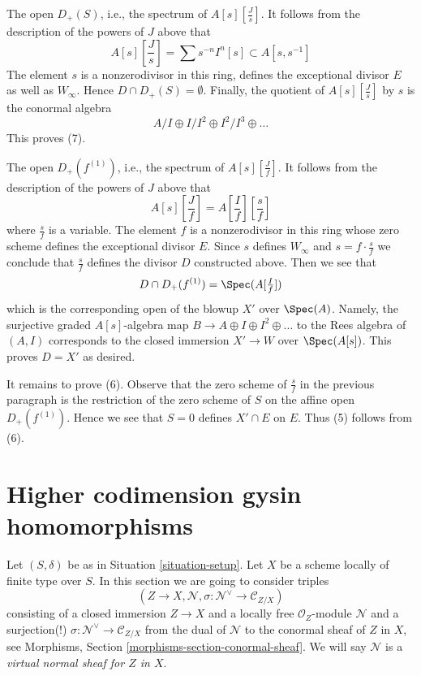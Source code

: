\medskip\noindent
The open $D_+(S)$, i.e., the spectrum of $A[s][\frac{J}{s}]$.
It follows from the description of the powers of $J$ above
that
$$
A[s][\textstyle{\frac{J}{s}}] = \sum s^{-n}I^n[s] \subset A[s, s^{-1}]
$$
The element $s$ is a nonzerodivisor in this ring, defines the exceptional
divisor $E$ as well as $W_\infty$. Hence $D \cap D_+(S) = \emptyset$.
Finally, the quotient of $A[s][\frac{J}{s}]$ by $s$ is the conormal algebra
$$
A/I \oplus I/I^2 \oplus I^2/I^3 \oplus \ldots
$$
This proves (7).

\medskip\noindent
The open $D_+(f^{(1)})$, i.e., the spectrum of $A[s][\frac{J}{f}]$.
It follows from the description of the powers of $J$ above that
$$
A[s][\textstyle{\frac{J}{f}}] =
A[\textstyle{\frac{I}{f}}][\textstyle{\frac{s}{f}}]
$$
where $\frac{s}{f}$ is a variable. The element $f$ is a nonzerodivisor
in this ring whose zero scheme defines the exceptional divisor $E$.
Since $s$ defines $W_\infty$ and $s = f \cdot \frac{s}{f}$
we conclude that $\frac{s}{f}$ defines
the divisor $D$ constructed above. Then we see that
$$
D \cap D_+(f^{(1)}) = \Spec(A[\textstyle{\frac{I}{f}}])
$$
which is the corresponding open of the blowup $X'$ over $\Spec(A)$.
Namely, the surjective graded $A[s]$-algebra map
$B \to A \oplus I \oplus I^2 \oplus \ldots$
to the Rees algebra of $(A, I)$ corresponds to the closed
immersion $X' \to W$ over $\Spec(A[s])$.
This proves $D = X'$ as desired.

\medskip\noindent
It remains to prove (6). Observe that the zero scheme of $\frac{s}{f}$
in the previous paragraph is the restriction of the zero scheme of $S$
on the affine open $D_+(f^{(1)})$. Hence we see that $S = 0$ defines
$X' \cap E$ on $E$. Thus (5) follows from (6).









\section{Higher codimension gysin homomorphisms}
\label{section-gysin-higher-codimension}

\noindent
Let $(S, \delta)$ be as in Situation \ref{situation-setup}. Let $X$ be a scheme
locally of finite type over $S$. In this section we are going to consider
triples
$$
(Z \to X, \mathcal{N}, \sigma : \mathcal{N}^\vee \to \mathcal{C}_{Z/X})
$$
consisting of a closed immersion $Z \to X$ and a locally free
$\mathcal{O}_Z$-module $\mathcal{N}$ and a surjection(!)
$\sigma : \mathcal{N}^\vee \to \mathcal{C}_{Z/X}$ from the dual
of $\mathcal{N}$ to the conormal sheaf of $Z$ in $X$, see
Morphisms, Section \ref{morphisms-section-conormal-sheaf}.
We will say
$\mathcal{N}$ is a {\it virtual normal sheaf for $Z$ in $X$}.


